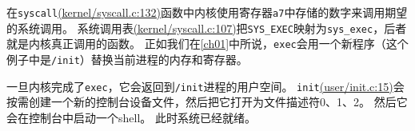 在\texttt{syscall}\href{https://github.com/mit-pdos/xv6-riscv/blob/risc/kernel/syscall.c#L132}{(kernel/syscall.c:132)}函数中内核使用寄存器\texttt{a7}中存储的数字来调用期望的系统调用。
系统调用表\href{https://github.com/mit-pdos/xv6-riscv/blob/risc/kernel/syscall.c#L107}{(kernel/syscall.c:107)}把\texttt{SYS\_EXEC}映射为\texttt{sys\_exec}，后者就是内核真正调用的函数。
正如我们在\autoref{ch01}中所说，\texttt{exec}会用一个新程序（这个例子中是\texttt{/init}）替换当前进程的内存和寄存器。

一旦内核完成了\texttt{exec}，它会返回到\texttt{/init}进程的用户空间。
\texttt{init}\href{https://github.com/mit-pdos/xv6-riscv/blob/risc/user/init.c#L15}{(user/init.c:15)}会按需创建一个新的控制台设备文件，然后把它打开为文件描述符0、1、2。
然后它会在控制台中启动一个shell。
此时系统已经就绪。
